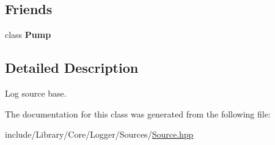 \subsection*{Friends}
\begin{DoxyCompactItemize}
\item 
\mbox{\label{classlibrary_1_1core_1_1logger_1_1sources_1_1_source_a64fbdb62a5c5f27e0d022da36aab93d9}} 
class {\bfseries Pump}
\end{DoxyCompactItemize}


\subsection{Detailed Description}
Log source base. 

The documentation for this class was generated from the following file\+:\begin{DoxyCompactItemize}
\item 
include/\+Library/\+Core/\+Logger/\+Sources/\hyperlink{_sources_2_source_8hpp}{Source.\+hpp}\end{DoxyCompactItemize}
